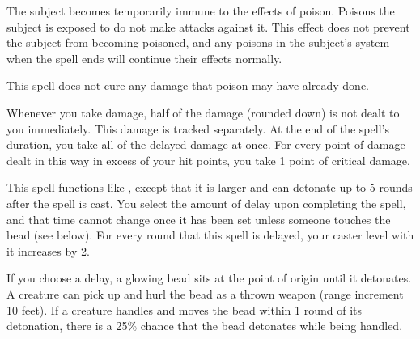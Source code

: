 \spellrng{\rngclose}
\spelldur{\durshort}
\begin{spelleffect}
  The subject becomes temporarily immune to the effects of poison. Poisons the subject is exposed to do not make attacks against it. This effect does not prevent the subject from becoming poisoned, and any poisons in the subject's system when the spell ends will continue their effects normally. 
\end{spelleffect}
\begin{spellnotes}
  This spell does not cure any damage that poison may have already done.
\end{spellnotes}

\spelldur{\durmed}
\begin{spelleffect}
    Whenever you take damage, half of the damage (rounded down) is not dealt to you immediately. This damage is tracked separately. At the end of the spell's duration, you take all of the delayed damage at once. For every point of damage dealt in this way in excess of your hit points, you take 1 point of critical damage.
\end{spelleffect}

\begin{spelleffect}
  This spell functions like , except that it is larger and can detonate up to 5 rounds after the spell is cast. You select the amount of delay upon completing the spell, and that time cannot change once it has been set unless someone touches the bead (see below). For every round that this spell is delayed, your caster level with it increases by 2.

  If you choose a delay, a glowing bead sits at the point of origin until it detonates. A creature can pick up and hurl the bead as a thrown weapon (range increment 10 feet). If a creature handles and moves the bead within 1 round of its detonation, there is a 25\% chance that the bead detonates while being handled.
\end{spelleffect}

